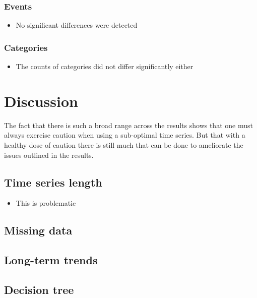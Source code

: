 \documentclass[]{article}
\providecommand{\tightlist}{%
  \setlength{\itemsep}{0pt}\setlength{\parskip}{0pt}}
\begin{document}
\subsubsection{Events}\label{events-2}

\begin{itemize}
\tightlist
\item
  No significant differences were detected
\end{itemize}

\subsubsection{Categories}\label{categories-2}

\begin{itemize}
\tightlist
\item
  The counts of categories did not differ significantly either
\end{itemize}

\section{Discussion}\label{discussion}

The fact that there is such a broad range across the results shows that
one must always exercise caution when using a sub-optimal time series.
But that with a healthy dose of caution there is still much that can be
done to ameliorate the issues outlined in the results.

\subsection{Time series length}\label{time-series-length}

\begin{itemize}
\tightlist
\item
  This is problematic
\end{itemize}

\subsection{Missing data}\label{missing-data-1}

\subsection{Long-term trends}\label{long-term-trends-1}

\subsection{Decision tree}\label{decision-tree}
\end{document}
